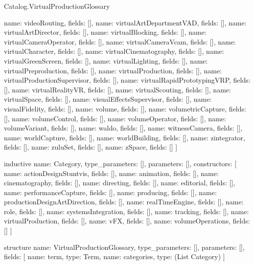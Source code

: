 \begin{lexlean}{Catalog.VirtualProductionGlossary}
\begin{semanticmodule}
{    {name: videoRouting, fields: []},
    {name: virtualArtDepartmentVAD, fields: []},
    {name: virtualArtDirector, fields: []},
    {name: virtualBlocking, fields: []},
    {name: virtualCameraOperator, fields: []},
    {name: virtualCameraVcam, fields: []},
    {name: virtualCharacter, fields: []},
    {name: virtualCinematography, fields: []},
    {name: virtualGreenScreen, fields: []},
    {name: virtualLighting, fields: []},
    {name: virtualPreproduction, fields: []},
    {name: virtualProduction, fields: []},
    {name: virtualProductionSupervisor, fields: []},
    {name: virtualRapidPrototypingVRP, fields: []},
    {name: virtualRealityVR, fields: []},
    {name: virtualScouting, fields: []},
    {name: virtualSpace, fields: []},
    {name: visualEffectsSupervisor, fields: []},
    {name: visualFidelity, fields: []},
    {name: volume, fields: []},
    {name: volumetricCapture, fields: []},
    {name: volumeControl, fields: []},
    {name: volumeOperator, fields: []},
    {name: volumeVariant, fields: []},
    {name: waldo, fields: []},
    {name: witnessCamera, fields: []},
    {name: worldCapture, fields: []},
    {name: worldBuilding, fields: []},
    {name: zintegrator, fields: []},
    {name: zuluSet, fields: []},
    {name: zSpace, fields: []}
  ]
}

inductive{
  name: Category,
  type_parameters: [],
  parameters: [],
  constructors: [
    {name: actionDesignStuntvis, fields: []},
    {name: animation, fields: []},
    {name: cinematography, fields: []},
    {name: directing, fields: []},
    {name: editorial, fields: []},
    {name: performanceCapture, fields: []},
    {name: producing, fields: []},
    {name: productionDesignArtDirection, fields: []},
    {name: realTimeEngine, fields: []},
    {name: role, fields: []},
    {name: systemsIntegration, fields: []},
    {name: tracking, fields: []},
    {name: virtualProduction, fields: []},
    {name: vFX, fields: []},
    {name: volumeOperations, fields: []}
  ]
}

structure{
  name: VirtualProductionGlossary,
  type_parameters: [],
  parameters: [],
  fields: [
    {name: term, type: Term},
    {name: categories, type: (List Category)}
  ]
}
\end{semanticmodule}
\end{lexlean}
